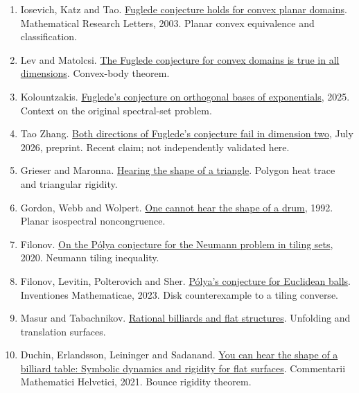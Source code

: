 \documentclass[11pt]{article}
\begin{document}
\begin{enumerate}


\item \hypertarget{ref1}{}Iosevich, Katz and Tao. \href{https://arxiv.org/abs/math/0104087}{Fuglede conjecture holds for convex planar domains}. Mathematical Research Letters, 2003. Planar convex equivalence and classification.

\item \hypertarget{ref2}{}Lev and Matolcsi. \href{https://arxiv.org/abs/1904.12262}{The Fuglede conjecture for convex domains is true in all dimensions}. Convex-body theorem.

\item \hypertarget{ref3}{}Kolountzakis. \href{https://arxiv.org/abs/2509.05782}{Fuglede's conjecture on orthogonal bases of exponentials}, 2025. Context on the original spectral-set problem.

\item \hypertarget{ref4}{}Tao Zhang. \href{https://arxiv.org/abs/2607.15632}{Both directions of Fuglede's conjecture fail in dimension two}, July 2026, preprint. Recent claim; not independently validated here.

\item \hypertarget{ref5}{}Grieser and Maronna. \href{https://arxiv.org/abs/1208.3163}{Hearing the shape of a triangle}. Polygon heat trace and triangular rigidity.

\item \hypertarget{ref6}{}Gordon, Webb and Wolpert. \href{https://arxiv.org/abs/math/9207215}{One cannot hear the shape of a drum}, 1992. Planar isospectral noncongruence.

\item \hypertarget{ref7}{}Filonov. \href{https://arxiv.org/abs/2006.10663}{On the Pólya conjecture for the Neumann problem in tiling sets}, 2020. Neumann tiling inequality.

\item \hypertarget{ref8}{}Filonov, Levitin, Polterovich and Sher. \href{https://arxiv.org/abs/2203.07696}{Pólya's conjecture for Euclidean balls}. Inventiones Mathematicae, 2023. Disk counterexample to a tiling converse.

\item \hypertarget{ref9}{}Masur and Tabachnikov. \href{https://math.uchicago.edu/~masur/handbook1.pdf}{Rational billiards and flat structures}. Unfolding and translation surfaces.

\item \hypertarget{ref10}{}Duchin, Erlandsson, Leininger and Sadanand. \href{https://arxiv.org/abs/1804.05690}{You can hear the shape of a billiard table: Symbolic dynamics and rigidity for flat surfaces}. Commentarii Mathematici Helvetici, 2021. Bounce rigidity theorem.


\end{enumerate}
\end{document}
